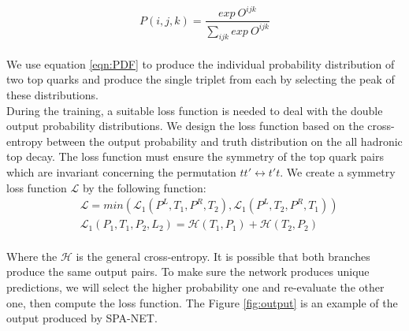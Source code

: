 \\
\begin{equation}\label{eqn:PDF}
	P(i,j,k) = \frac{exp\ O^{ijk}}{\sum_{ijk} exp\ O^{ijk}}
\end{equation}
\\
We use equation \ref{eqn:PDF} to produce the individual probability distribution of two top quarks and produce the single triplet from each by selecting the peak of these distributions. 
\\
During the training, a suitable loss function is needed to deal with the double output probability distributions. We design the loss function based on the cross-entropy between the output probability and truth distribution on the all hadronic top decay. The loss function must ensure the symmetry of the top quark pairs which are invariant concerning the permutation $tt' \leftrightarrow t't$.  We create a symmetry loss function $\mathcal{L}$ by the following function:
\\
\begin{align}
		&\mathcal{L} = min(\mathcal{L}_{1}(P^{L}, T_{1}, P^{R}, T_{2}), \mathcal{L}_{1}(P^{L}, T_{2}, P^{R}, T_{1})) \\
		&\mathcal{L}_{1}(P_{1}, T_{1}, P_{2}, L_{2}) = \mathcal{H}(T_{1}, P_{1}) +\mathcal{H}(T_{2}, P_{2})
\end{align}
\\
Where the $\mathcal{H}$ is the general cross-entropy. It is possible that both branches produce the same output pairs. To make sure the network produces unique predictions, we will select the higher probability one and re-evaluate the other one, then compute the loss function. The Figure \ref{fig:output} is an example of the output produced by SPA-NET.










